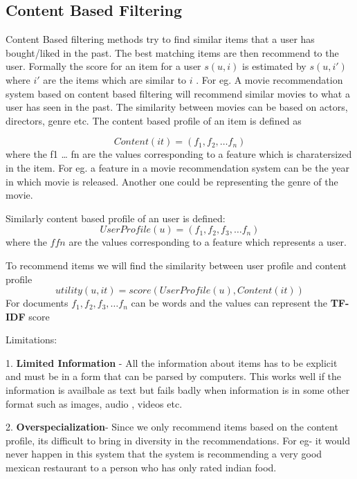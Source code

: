 \subsection{Content Based Filtering}

Content Based filtering methods try to find similar items that a user has bought/liked in the past. The best matching items are then recommend to the user. Formally the score for an item for a user $s(u,i)$ is estimated by $s(u,i')$ where $i'$ are the items which are similar to $i$ . For eg. A movie recommendation system based on content based filtering will recommend similar movies to what a user has seen in the past. The similarity between movies can be based on actors, directors, genre etc. The content based profile of an item is defined as

\begin{equation}
Content(it) = (f_1,f_2,\dots f_n) 
\end{equation}
where the f1 … fn are the values corresponding to a feature which is charatersized in the item. For eg. a feature in a movie recommendation system can be the year in which movie is released. Another one could be representing the genre of the movie.

Similarly content based profile of an user is defined:
\begin{equation}
UserProfile(u) = (f_1,f_2,f_3,\dots f_n)
\end{equation}
where the $f fn$ are the values corresponding to a feature which represents a user.

To recommend items we will find the similarity between user profile and content profile
\begin{equation}
utility(u,it) = score(UserProfile(u), Content(it))
\end{equation}
For documents $f_1,f_2,f_3,\dots f_n$ can be words and the values can represent the {\bf TF-IDF} score

Limitations:

1. {\bf Limited Information} - All the information about items has to be explicit and must be in a form that can be parsed by computers. This works well if the information is availbale as text but fails badly when information is in some other format such as images, audio , videos etc.

2. {\bf Overspecialization}- Since we only recommend items based on the content profile, its difficult to bring in diversity in the recommendations. For eg- it would never happen in this system that the system is recommending a very good mexican restaurant to a person who has only rated indian food.

